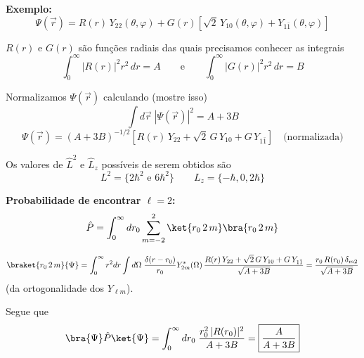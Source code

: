 \textbf{Exemplo:}
\begin{equation}
    \Psi(\vec{r}) = R(r)\,Y_{22}(\theta,\varphi) + G(r)\left[\sqrt{2}\,Y_{10}(\theta,\varphi) + Y_{1\bar{1}}(\theta,\varphi)\right]
\label{eq:aula22_exemplo_completo_psi}
\end{equation}

$R(r)$ e $G(r)$ são funções radiais das quais precisamos conhecer as integrais
\begin{equation}
    \int_0^\infty |R(r)|^2 r^2 \, dr = A \qquad \text{e} \qquad \int_0^\infty |G(r)|^2 r^2 \, dr = B
\label{eq:aula22_integrais_radiais}
\end{equation}

Normalizamos $\Psi(\vec{r})$ calculando (mostre isso)
\begin{equation}
    \int d\vec{r} \; |\Psi(\vec{r})|^2 = A + 3B
\label{eq:aula22_normalizacao_psi}
\end{equation}
\begin{equation}
    \Psi(\vec{r}) = (A+3B)^{-1/2}\left[R(r)\,Y_{22} + \sqrt{2}\,G\,Y_{10} + G\,Y_{1\bar{1}}\right] \quad \text{(normalizada)}
\label{eq:aula22_psi_normalizada}
\end{equation}

Os valores de $\hat{L}^2$ e $\hat{L}_z$ possíveis de serem obtidos são
\begin{equation}
    L^2 = \{2\hbar^2 \text{ e } 6\hbar^2\} \qquad L_z = \{-\hbar, 0, 2\hbar\}
\label{eq:aula22_valores_possiveis}
\end{equation}

\textbf{Probabilidade de encontrar $\ell=2$:}
\begin{equation}
    \hat{P} = \int_0^\infty dr_0 \sum_{m=-2}^{2} \ket{r_0\,2\,m}\bra{r_0\,2\,m}
\label{eq:aula22_projetor_l2_exemplo}
\end{equation}

\begin{equation}
    \braket{r_0\,2\,m}{\Psi} = \int_0^\infty r^2 dr \int d\Omega \; \frac{\delta(r-r_0)}{r_0}Y_{2m}^*(\Omega)\,\frac{R(r)\,Y_{22}+\sqrt{2}\,G\,Y_{10}+G\,Y_{1\bar{1}}}{\sqrt{A+3B}}
    = \frac{r_0\,R(r_0)\,\delta_{m2}}{\sqrt{A+3B}}
\label{eq:aula22_braket_r02m}
\end{equation}
(da ortogonalidade dos $Y_{\ell m}$).

Segue que
\begin{equation}
    \bra{\Psi}\hat{P}\ket{\Psi} = \int_0^\infty dr_0 \; \frac{r_0^2\,|R(r_0)|^2}{A+3B} = \boxed{\frac{A}{A+3B}}
\label{eq:aula22_probabilidade_l2}
\end{equation}

